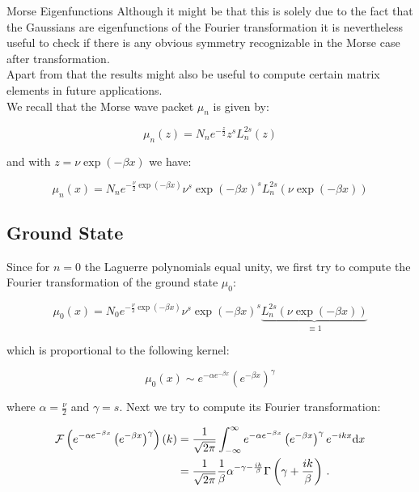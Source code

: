 \begin{chapter}{Morse Eigenfunctions}
Although it might be that this is solely due to the fact that the Gaussians are eigenfunctions of the Fourier transformation it is nevertheless useful to check
if there is any obvious symmetry recognizable in the Morse case after transformation.\\
Apart from that the results might also be useful to compute certain matrix elements in future applications.\\

We recall that the  Morse wave packet $\mu_{n}$ is given by:

\begin{equation}
  \mu_{n}(z) = N_{n} e^{-\frac{z}{2}} z^{s} L_{n}^{2s}(z)
\end{equation}

and with $z = \nu \exp(-\beta x)$ we have:

\begin{equation}
  \mu_{n}(x) = N_{n} e^{-\frac{\nu}{2} \exp(-\beta x)} \nu^{s} \exp(-\beta x)^{s} L_{n}^{2s}\left(\nu \exp(-\beta x)\right)
\end{equation}

\subsection{Ground State}
Since for $n=0$ the Laguerre polynomials equal unity, we first try to compute the Fourier transformation of the ground state $\mu_{0}$:

\begin{equation}
  \mu_{0}(x) = N_{0} e^{-\frac{\nu}{2} \exp(-\beta x)} \nu^{s} \exp(-\beta x)^{s} \underbrace{L_{n}^{2s}\left(\nu \exp(-\beta x)\right)}_{\equiv 1}
\end{equation}

which is proportional to the following kernel:

\begin{equation}
  \mu_{0}(x) \sim e^{-\alpha e^{-\beta x}} \left(e^{-\beta x}\right)^{\gamma}
\end{equation}

where $\alpha = \frac{\nu}{2}$ and $\gamma = s$. Next we try to compute its
Fourier transformation:

\begin{align}
  \mathcal{F}\left(e^{-\alpha e^{-\beta x}} \left(e^{-\beta x}\right)^{\gamma}\right)(k)
  & = \frac{1}{\sqrt{2\pi}} \int_{-\infty}^{\infty} e^{-\alpha e^{-\beta x}} \left(e^{-\beta x}\right)^{\gamma} e^{- i k x} \mathrm{d}x \\
  & = \frac{1}{\sqrt{2\pi}}
  \frac{1}{\beta}
  \alpha^{-\gamma -\frac{i k}{\beta}}
  \Gamma \left(\gamma+\frac{i k}{\beta}\right) \,.
\end{align}


\end{chapter}
